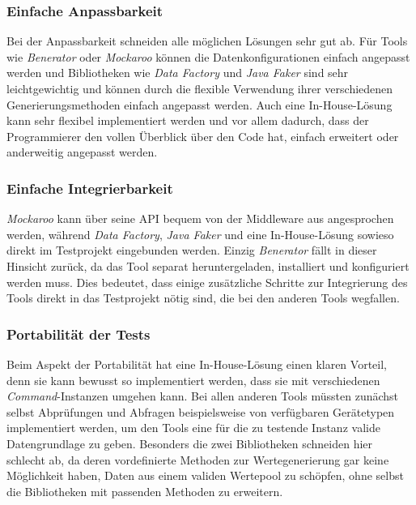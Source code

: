 \subsubsection*{Einfache Anpassbarkeit}
Bei der Anpassbarkeit schneiden alle möglichen Lösungen sehr gut ab. Für Tools wie \textit{Benerator} oder \textit{Mockaroo} können die Datenkonfigurationen einfach angepasst werden und Bibliotheken wie \textit{Data Factory} und \textit{Java Faker} sind sehr leichtgewichtig und können durch die flexible Verwendung ihrer verschiedenen Generierungsmethoden einfach angepasst werden. Auch eine In-House-Lösung kann sehr flexibel implementiert werden und vor allem dadurch, dass der Programmierer den vollen Überblick über den Code hat, einfach erweitert oder anderweitig angepasst werden.

\subsubsection*{Einfache Integrierbarkeit}
\textit{Mockaroo} kann über seine \ac{API} bequem von der Middleware aus angesprochen werden, während \textit{Data Factory}, \textit{Java Faker} und eine In-House-Lösung sowieso direkt im Testprojekt eingebunden werden. Einzig \textit{Benerator} fällt in dieser Hinsicht zurück, da das Tool separat heruntergeladen, installiert und konfiguriert werden muss. Dies bedeutet, dass einige zusätzliche Schritte zur Integrierung des Tools direkt in das Testprojekt nötig sind, die bei den anderen Tools wegfallen.

\subsubsection*{Portabilität der Tests}
Beim Aspekt der Portabilität hat eine In-House-Lösung einen klaren Vorteil, denn sie kann bewusst so implementiert werden, dass sie mit verschiedenen \textit{Command}-Instanzen umgehen kann. Bei allen anderen Tools müssten zunächst selbst Abprüfungen und Abfragen beispielsweise von verfügbaren Gerätetypen implementiert werden, um den Tools eine für die zu testende Instanz valide Datengrundlage zu geben. Besonders die zwei Bibliotheken schneiden hier schlecht ab, da deren vordefinierte Methoden zur Wertegenerierung gar keine Möglichkeit haben, Daten aus einem validen Wertepool zu schöpfen, ohne selbst die Bibliotheken mit passenden Methoden zu erweitern.

